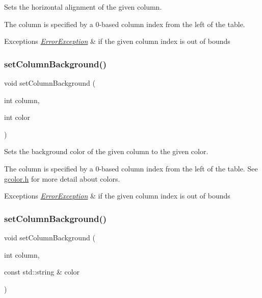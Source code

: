 Sets the horizontal alignment of the given column. 

The column is specified by a 0-\/based column index from the left of the table. 
\begin{DoxyExceptions}{Exceptions}
{\em \mbox{\hyperlink{classErrorException}{Error\+Exception}}} & if the given column index is out of bounds \\
\hline
\end{DoxyExceptions}
\mbox{\label{classGTable_a48898e733d8ae3e285ff84d02e2cdee5}} 
\subsubsection{\texorpdfstring{set\+Column\+Background()}{setColumnBackground()}\hspace{0.1cm}{\footnotesize\ttfamily [1/2]}}
{\footnotesize\ttfamily void set\+Column\+Background (\begin{DoxyParamCaption}\item[{int}]{column,  }\item[{int}]{color }\end{DoxyParamCaption})\hspace{0.3cm}{\ttfamily [virtual]}}



Sets the background color of the given column to the given color. 

The column is specified by a 0-\/based column index from the left of the table. See \mbox{\hyperlink{gcolor_8h_source}{gcolor.\+h}} for more detail about colors. 
\begin{DoxyExceptions}{Exceptions}
{\em \mbox{\hyperlink{classErrorException}{Error\+Exception}}} & if the given column index is out of bounds \\
\hline
\end{DoxyExceptions}
\mbox{\label{classGTable_a37fd3b921a5fba28b84dd4dd17fa9930}} 
\subsubsection{\texorpdfstring{set\+Column\+Background()}{setColumnBackground()}\hspace{0.1cm}{\footnotesize\ttfamily [2/2]}}
{\footnotesize\ttfamily void set\+Column\+Background (\begin{DoxyParamCaption}\item[{int}]{column,  }\item[{const std\+::string \&}]{color }\end{DoxyParamCaption})\hspace{0.3cm}{\ttfamily [virtual]}}



